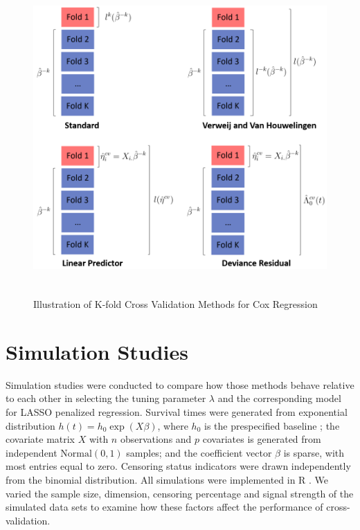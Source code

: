 \begin{figure}
  \centering
  \includegraphics[height= 12cm ]{./figures/figure_1_new.png}
  \caption{Illustration of K-fold Cross Validation Methods for Cox Regression}
\end{figure}	

\section{Simulation Studies}

Simulation studies were conducted to compare how those methods behave relative to each other in selecting the tuning parameter $\lambda$ and the corresponding model for LASSO penalized regression. Survival times were generated from exponential distribution $h(t) = h_{0} \exp(X\beta)$, where $h_{0}$ is the prespecified baseline ; the covariate matrix $X$ with $n$ observations and $p$ covariates is generated from independent $\text{Normal}(0, 1)$ samples; and the coefficient vector $\beta$ is sparse, with most entries equal to zero. Censoring status indicators were drawn independently from the binomial distribution. All simulations were implemented in R \citep{R}. We varied the sample size, dimension, censoring percentage and signal strength of the simulated data sets to examine how these factors affect the performance of cross-validation.
   
